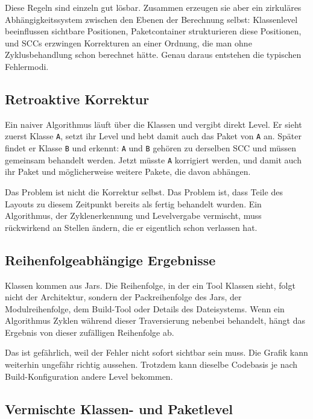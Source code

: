 \documentclass[a4paper,11pt]{article}
\begin{document}
Diese Regeln sind einzeln gut l\"osbar. Zusammen erzeugen sie aber ein
zirkul\"ares Abh\"angigkeitssystem zwischen den Ebenen der Berechnung selbst:
Klassenlevel beeinflussen sichtbare Positionen, Paketcontainer strukturieren
diese Positionen, und SCCs erzwingen Korrekturen an einer Ordnung, die man
ohne Zyklusbehandlung schon berechnet h\"atte. Genau daraus entstehen die
typischen Fehlermodi.

\subsection{Retroaktive Korrektur}

Ein naiver Algorithmus l\"auft \"uber die Klassen und vergibt direkt Level. Er
sieht zuerst Klasse \texttt{A}, setzt ihr Level und hebt damit auch das Paket
von \texttt{A} an. Sp\"ater findet er Klasse \texttt{B} und erkennt: \texttt{A}
und \texttt{B} geh\"oren zu derselben SCC und m\"ussen gemeinsam behandelt
werden. Jetzt m\"usste \texttt{A} korrigiert werden, und damit auch ihr Paket
und m\"oglicherweise weitere Pakete, die davon abh\"angen.

Das Problem ist nicht die Korrektur selbst. Das Problem ist, dass Teile des
Layouts zu diesem Zeitpunkt bereits als fertig behandelt wurden. Ein
Algorithmus, der Zyklenerkennung und Levelvergabe vermischt, muss r\"uckwirkend
an Stellen \"andern, die er eigentlich schon verlassen hat.

\subsection{Reihenfolgeabh\"angige Ergebnisse}

Klassen kommen aus Jars. Die Reihenfolge, in der ein Tool Klassen sieht, folgt
nicht der Architektur, sondern der Packreihenfolge des Jars, der Modulreihenfolge,
dem Build-Tool oder Details des Dateisystems. Wenn ein Algorithmus Zyklen
w\"ahrend dieser Traversierung nebenbei behandelt, h\"angt das Ergebnis von
dieser zuf\"alligen Reihenfolge ab.

Das ist gef\"ahrlich, weil der Fehler nicht sofort sichtbar sein muss. Die
Grafik kann weiterhin ungef\"ahr richtig aussehen. Trotzdem kann dieselbe
Codebasis je nach Build-Konfiguration andere Level bekommen.

\subsection{Vermischte Klassen- und Paketlevel}
\end{document}
